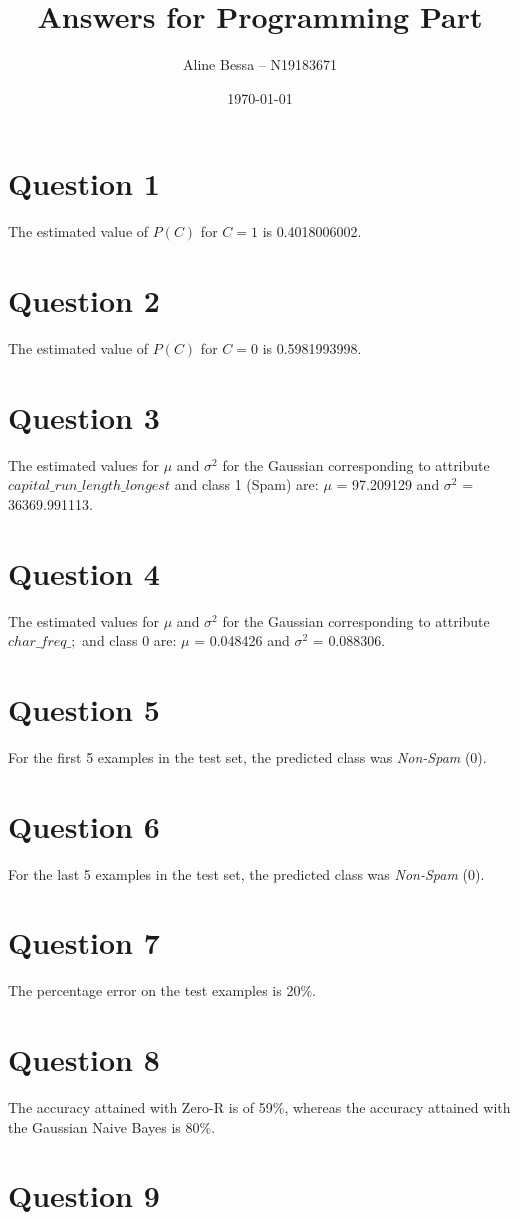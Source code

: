 \documentclass[leqno]{article}
\title{Answers for Programming Part}
\author{Aline Bessa -- N19183671}
\date\today
\begin{document}
\maketitle %

\section*{Question 1} The estimated value of $P(C)$ for $C = 1$ is 0.4018006002.


\section*{Question 2} The estimated value of $P(C)$ for $C = 0$ is 0.5981993998.


\section*{Question 3} The estimated values for $\mu$ and $\sigma^2$ for the Gaussian corresponding to attribute $capital\_run\_length\_longest$ and 
class 1 (Spam) are: $\mu$  = 97.209129 and $\sigma^2$ = 36369.991113.


\section*{Question 4}  The estimated values for $\mu$ and $\sigma^2$ for the Gaussian corresponding to attribute $char\_freq\_;$ and 
class 0 are: $\mu$ = 0.048426 and $\sigma^2$  = 0.088306.


\section*{Question 5} For the first 5 examples in the test set, the predicted class was \textit{Non-Spam} (0).


\section*{Question 6} For the last 5 examples in the test set, the predicted class was \textit{Non-Spam} (0).



\section*{Question 7} The percentage error on the test examples is 20\%.


\section*{Question 8} The accuracy attained with Zero-R is of 59\%, whereas the accuracy attained with the Gaussian Naive Bayes is 80\%.

\section*{Question 9}
\end{document}
